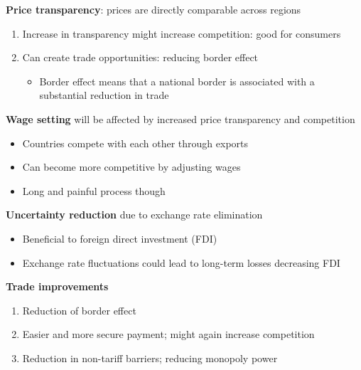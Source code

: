 \documentclass{beamer}
\begin{document}
\begin{frame}
  \textbf{Price transparency}: prices are directly comparable across regions
  \begin{enumerate}
    \item Increase in transparency might increase competition: good for consumers
    \item Can create trade opportunities: reducing border effect
    \begin{itemize}
      \item Border effect means that a national border is associated with a substantial reduction in trade
    \end{itemize}
  \end{enumerate}
\end{frame}

\begin{frame}
  \textbf{Wage setting} will be affected by increased price transparency and competition  
    \begin{itemize}
    \item Countries compete with each other through exports
    \item Can become more competitive by adjusting wages   
    \item Long and painful process though
  \end{itemize}  
\end{frame}

\begin{frame}
  \textbf{Uncertainty reduction} due to exchange rate elimination
  \begin{itemize}
    \item Beneficial to foreign direct investment (FDI)
    \item Exchange rate fluctuations could lead to long-term losses decreasing FDI
  \end{itemize}
\end{frame}

\begin{frame}
  \textbf{Trade improvements}
  \begin{enumerate}
    \item Reduction of border effect
    \item Easier and more secure payment; might again increase competition
    \item Reduction in non-tariff barriers; reducing monopoly power
  \end{enumerate}
\end{frame}
\end{document}
